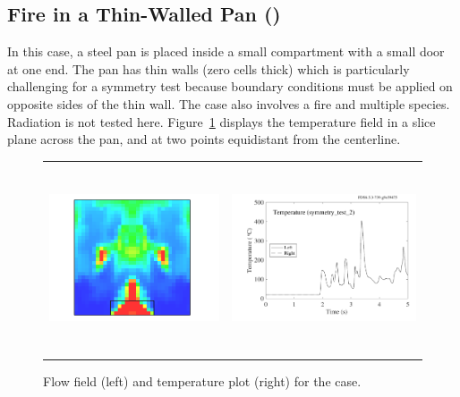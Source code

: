 \documentclass[11pt]{book}
\begin{document}
\subsection{Fire in a Thin-Walled Pan (\texorpdfstring{}{symmetry\_test\_2})}
\label{symmetry_test_2}

In this case, a steel pan is placed inside a small compartment with a small door at one end. The pan has thin walls (zero cells thick) which is particularly challenging for a symmetry test because boundary conditions must be applied on opposite sides of the thin wall. The case also involves a fire and multiple species. Radiation is not tested here. Figure~\ref{symmetry_test_2_fig} displays the temperature field in a slice plane across the pan, and at two points equidistant from the centerline.


\begin{figure}[!ht]
\begin{tabular*}{\textwidth}{lr}
\includegraphics[height=2.2in]{SCRIPT_FIGURES/symmetry_test_2} &
\includegraphics[height=2.2in]{SCRIPT_FIGURES/symmetry_test_2_plot}
\end{tabular*}
\caption[The  case]{Flow field (left) and temperature plot (right) for the  case.}
\label{symmetry_test_2_fig}
\end{figure}
\end{document}
